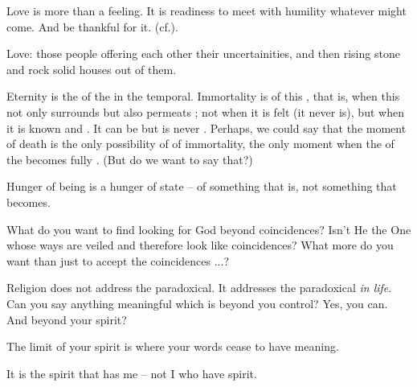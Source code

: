 
\pa\label{qpa:lin}
Love is more than a feeling. It is readiness to meet with humility whatever
might come. And be thankful for it. (cf.).

\pa
Love: those people offering each other their uncertainities, and then rising
stone and rock solid houses out of them.



\pa
Eternity is the  of the  in the temporal. 
Immortality is  of this , that is, when this
 not only surrounds but also permeats ; not when it
is felt (it never is), but when it is known and . It can be
 but is never . Perhaps, we
could say that the moment of death is the only possibility of 
of immortality, the only moment when the  of the 
becomes fully . (But do we want to say that?)


\pa
Hunger of being is a hunger of state -- of something that is, not
something that becomes. 


\pa
What do you want to find looking for God beyond coincidences? Isn't He
the One whose ways are veiled and therefore look like coincidences?
What more do you want than just to accept the coincidences ...?

\pa
Religion does not address the paradoxical. It addresses the paradoxical {\em in life}.
\pa
Can you say anything meaningful which is beyond you control? Yes, you
can. And beyond your spirit?

The limit of your spirit is where your words cease to have meaning. 

\pa
It is the spirit that has me -- not I who have spirit.

